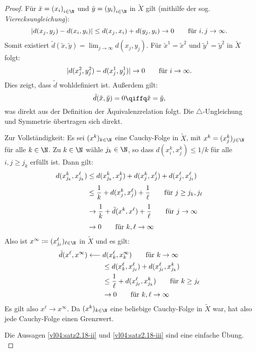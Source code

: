 \begin{proof}
    Für $\tilde x = \iSeq x$ und $\tilde y = \iSeq y$ in $\tilde X$ gilt 
    (mithilfe der sog. \emph{Vierecksungleichung}):
    \[  \abs{d(x_j,y_j)-d(x_i,y_i)} \leq d(x_j,x_i) + d(y_j,y_i) \to 0 
        \fuer i,j\to\infty
    . \]
    Somit existiert $\tilde d(\tilde x,\tilde y) = \lim_{j\to\infty}
    d(x_j,y_j)$. Für $\tilde x^1=\tilde x^2$ und $\tilde
    y^1=\tilde y^2$ in $\tilde X$ folgt:
    \[ \abs{d(x_j^2,y_j^2)-d(x_j^1,y_j^1)} \to 0 \fuer i\to\infty . \]
    Dies zeigt, dass $\tilde d$ wohldefiniert ist. Außerdem gilt:
    \[ \tilde d(\tilde x,\tilde y) = 0 \qiffq
        \tilde x = \tilde y
    , \]
    was direkt aus der Definition der Äquivalenzrelation folgt.
    Die $\triangle$-Ungleichung und Symmetrie übertragen sich direkt.
    
    Zur Vollständigkeit: Es sei $(x^k)_{k\in\N}$ eine Cauchy-Folge in 
    $\tilde X$, mit $x^k = (x_j^k)_{j\in\N}$ für alle $k\in\N$. Zu $k\in\N$
    wähle $j_k\in\N$, so dass $d(x_i^k,x_j^k) \leq 1/k$ für alle $i,j\geq j_k$
    erfüllt ist. Dann gilt:
    \begin{align*}
        d(x_{j_k}^k, x_{j_k}^\ell) 
        &\leq d(x_{j_k}^k,x_j^k) + d(x_j^k,x_j^\ell) +
        d(x_j^\ell,x_{j_\ell}^\ell)
        \\[0.75ex]
        &\leq \frac{1}{k} + d(x_j^k,x_j^\ell) + \frac{1}{\ell}
        \fuer j\geq j_k,j_\ell
        \\[0.75ex]
        &\to \frac{1}{k} + \tilde d(x^k,x^\ell) + \frac{1}{\ell} 
        \fuer j\to\infty
        \\[0.75ex]
        &\to 0 \fuer k,\ell\to\infty
    \end{align*}
    Also ist $x^\infty \defeq (x_{j_\ell}^\ell)_{\ell\in\N}$ in $\tilde X$ und es
    gilt:
    \begin{align*}
        \tilde d(x^\ell, x^\infty)
        \longleftarrow\;  &d(x_k^\ell, x_k^\infty)  \fuer k\to\infty
        \\
        &\leq d(x_k^\ell,x_{j_\ell}^\ell) + d(x_{j_\ell}^\ell,x_{j_k}^k)
        \\
        &\leq \frac{1}{\ell} + d(x_{j_\ell}^\ell,x_{j_k}^k)
        \fuer k\geq j_\ell
        \\
        &\to 0 \fuer k,\ell\to\infty
    \end{align*}
    Es gilt also $x^\ell\to x^\infty$. Da $(x^k)_{k\in\N}$ eine beliebige
    Cauchy-Folge in $\tilde X$ war, hat also jede Cauchy-Folge einen Grenzwert.
    
    Die Aussagen \ref{vl04:satz2.18-ii} und \ref{vl04:satz2.18-iii} sind
    eine einfache Übung.
    \\
\end{proof}


